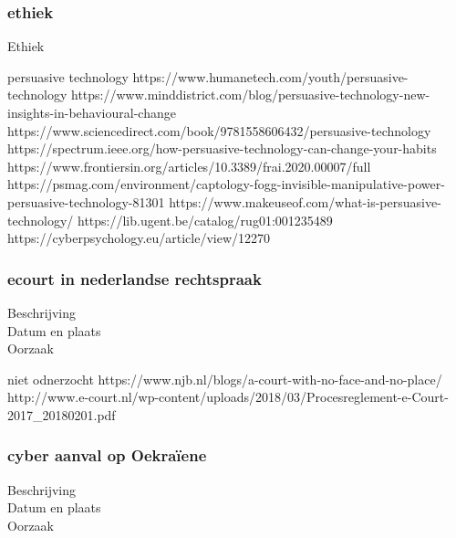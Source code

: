 {{{{{{{{{{{{{{\subsubsection{ethiek}


Ethiek 



persuasive technology 
https://www.humanetech.com/youth/persuasive-technology 
\cite{humanTechpersuasiveTech}
https://www.minddistrict.com/blog/persuasive-technology-new-insights-in-behavioural-change 
https://www.sciencedirect.com/book/9781558606432/persuasive-technology 
https://spectrum.ieee.org/how-persuasive-technology-can-change-your-habits 
\cite{rezenfeld01012018persuasiveTecgHabits}
https://www.frontiersin.org/articles/10.3389/frai.2020.00007/full 
\cite{aldenaini28042020persuasiveTechTrends}
https://psmag.com/environment/captology-fogg-invisible-manipulative-power-persuasive-technology-81301 
\cite{larson14062017persuasivetechmanipulates}
https://www.makeuseof.com/what-is-persuasive-technology/ 
\cite{tanzem22012022persuasivetechchanginglives}
https://lib.ugent.be/catalog/rug01:001235489 
https://cyberpsychology.eu/article/view/12270 
\cite{tikkakuddonenpersuasiveTechnology}



\subsubsection{ecourt in nederlandse rechtspraak}

	\begin{description}
	\item[Beschrijving]
	\item[Datum en plaats] 
	\item[Oorzaak]
\end{description}
niet odnerzocht
https://www.njb.nl/blogs/a-court-with-no-face-and-no-place/ 
\cite{sprongken19032018CourtProcedureDigital}
http://www.e-court.nl/wp-content/uploads/2018/03/Procesreglement-e-Court-2017_20180201.pdf
\cite{PROCESREGLEMENTEcourt}


\subsubsection{ cyber aanval op Oekraïene }

	\begin{description}
	\item[Beschrijving]
	\item[Datum en plaats] 
	\item[Oorzaak]
\end{description}

}}}}}}}}}}}}}}
